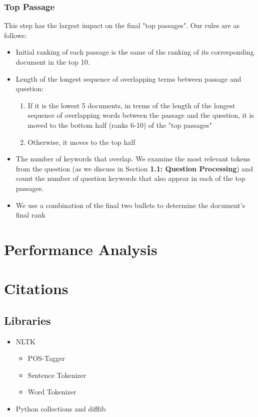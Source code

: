 \documentclass{article}
\begin{document}
\subsubsection{Top Passage}
This step has the largest impact on the final "top passages". Our rules are as follows:\\
\begin{itemize}
\item Initial ranking of each passage is the same of the ranking of its corresponding document in the top 10.
\item Length of the longest sequence of overlapping terms between passage and question:
	\begin{enumerate}
	\item If it is the lowest 5 documents, in terms of the length of the longest sequence of overlapping words between the passage and the question, it is moved to the bottom half (ranks 6-10) of the "top passages"
	\item Otherwise, it moves to the top half
	\end{enumerate}
\item The number of keywords that overlap. We examine the most relevant tokens from the question (as we discuss in Section \textbf{1.1: Question Processing}) and count the number of question keywords that also appear in each of the top passages.
\item We use a combination of the final two bullets to determine the document's final rank
\end{itemize}
\section{Performance Analysis}

\section{Citations}
\subsection{Libraries}
\begin{itemize}
\item NLTK
	\begin{itemize}
	\item POS-Tagger
	\item Sentence Tokenizer
	\item Word Tokenizer
	\end{itemize}
\item Python collections and difflib
\end{itemize}
\end{document}

